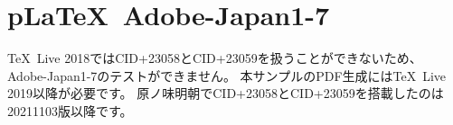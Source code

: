 \documentclass{jsarticle}
\begin{document}
\section{p\LaTeX~Adobe-Japan1-7}

\TeX~Live 2018ではCID+23058とCID+23059を扱うことができないため、
Adobe-Japan1-7のテストができません。
本サンプルのPDF生成には\TeX~Live 2019以降が必要です。
原ノ味明朝でCID+23058とCID+23059を搭載したのは20211103版以降です。




\end{document}

